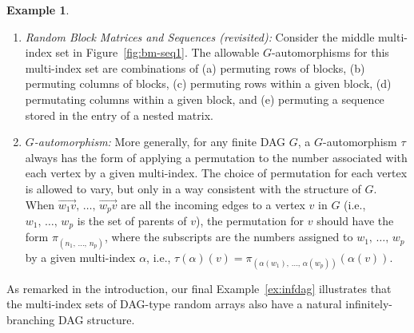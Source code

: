 \documentclass[10pt]{amsart}
\theoremstyle{definition}\newtheorem{defi}[theo]{Definition}\newtheorem{rema}[theo]{Remark}\newtheorem{exam}[theo]{Example}\newtheorem{exem}[theo]{Example}\newtheorem{nota}[theo]{Notation}
\begin{document}
\begin{exam}
\begin{enumerate}
\item \label{list2.3.3}\emph{Random Block Matrices and Sequences (revisited):} Consider the middle multi-index set in Figure~\ref{fig:bm-seq1}. The allowable $G$-automorphisms for this multi-index set are combinations of (a) permuting rows of blocks, (b) permuting columns of blocks, (c) permuting rows within a given block, (d) permutating columns within a given block, and (e) permuting a sequence stored in the entry of a nested matrix.


\item \label{list2.3.4}\emph{$G$-automorphism:} More generally, for any finite DAG $G$, a $G$-automorphism $\tau$ always has the form of applying a permutation to the number associated with each vertex by a given multi-index. The choice of permutation for each vertex is allowed to vary, but only in a way consistent with the structure of $G$. When $\overrightarrow{w_1v},\,\ldots,\,\overrightarrow{w_pv}$ are all the incoming edges to a vertex $v$ in $G$ (i.e., $w_1,\,\ldots,\,w_p$ is the set of parents of $v$), the permutation for $v$ should have the form $\pi_{(n_1,\,\ldots,\,n_p)}$, where the subscripts are the numbers assigned to $w_1,\,\ldots,\,w_p$ by a given multi-index $\alpha$, i.e., $\tau(\alpha)(v) = \pi_{(\alpha(w_1),\,\ldots,\,\alpha(w_p))}(\alpha(v))$.
\end{enumerate}
\end{exam}

As remarked in the introduction, our final Example~\ref{ex:infdag} illustrates that the multi-index sets of DAG-type random arrays also have a natural infinitely-branching DAG structure.
\end{document}
